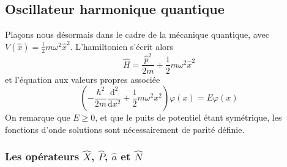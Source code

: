    \subsection{Oscillateur harmonique quantique}

        Plaçons nous désormais dans le cadre de la mécanique quantique, avec $V(\hat{x}) = \frac{1}{2} m \omega^2 \hat{x}^2$. L’hamiltonien s’écrit alors 
        \[ \hat{H} = \frac{\hat{p}^2}{2m} + \frac{1}{2} m \omega^2 \hat{x}^2 \]   
        et l’équation aux valeurs propres associée 
        \[\left( - \frac{\hbar^2}{2m} \frac{\text{d}^2}{\text{d}x^2} + \frac{1}{2} m \omega^2 x^2  \right) \varphi(x) = E \varphi(x) \]
        On remarque que $E \geq 0$, et que le puits de potentiel étant symétrique, les fonctions d’onde solutions sont nécessairement de parité définie.

        \subsubsection{Les opérateurs $\hat{X}$, $\hat{P}$, $\hat{a}$ et $\hat{N}$}

